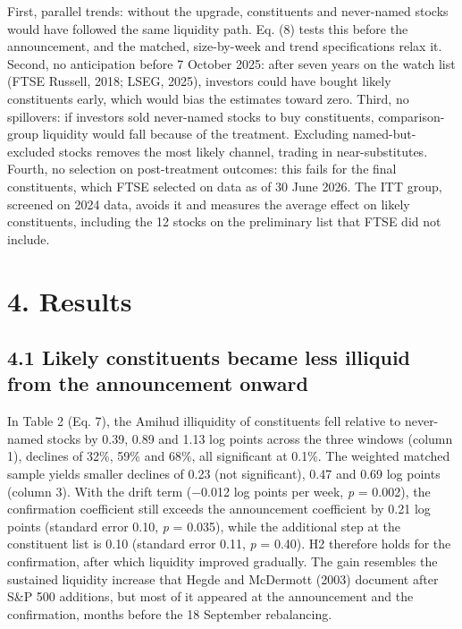 \documentclass[review,authoryear,12pt]{elsarticle}
\begin{document}
First, parallel trends: without the upgrade, constituents and
never-named stocks would have followed the same liquidity path. Eq. (8)
tests this before the announcement, and the matched, size-by-week and
trend specifications relax it. Second, no anticipation before 7 October
2025: after seven years on the watch list (FTSE Russell, 2018; LSEG,
2025), investors could have bought likely constituents early, which
would bias the estimates toward zero. Third, no spillovers: if investors
sold never-named stocks to buy constituents, comparison-group liquidity
would fall because of the treatment. Excluding named-but-excluded stocks
removes the most likely channel, trading in near-substitutes. Fourth, no
selection on post-treatment outcomes: this fails for the final
constituents, which FTSE selected on data as of 30 June 2026. The ITT
group, screened on 2024 data, avoids it and measures the average effect
on likely constituents, including the 12 stocks on the preliminary list
that FTSE did not include.

\hypertarget{results}{%
\section*{4. Results}}

\hypertarget{likely-constituents-became-less-illiquid-from-the-announcement-onward}{%
\subsection*{4.1 Likely constituents became less illiquid from the
announcement
onward}}

In Table 2 (Eq. 7), the Amihud illiquidity of constituents fell relative
to never-named stocks by 0.39, 0.89 and 1.13 log points across the three
windows (column 1), declines of 32\%, 59\% and 68\%, all significant at
0.1\%. The weighted matched sample yields smaller declines of 0.23 (not
significant), 0.47 and 0.69 log points (column 3). With the drift term
(−0.012 log points per week, \emph{p} = 0.002), the confirmation
coefficient still exceeds the announcement coefficient by 0.21 log
points (standard error 0.10, \emph{p} = 0.035), while the additional
step at the constituent list is 0.10 (standard error 0.11, \emph{p} =
0.40). H2 therefore holds for the confirmation, after which liquidity
improved gradually. The gain resembles the sustained liquidity increase
that Hegde and McDermott (2003) document after S\&P 500 additions, but
most of it appeared at the announcement and the confirmation, months
before the 18 September rebalancing.
\end{document}
